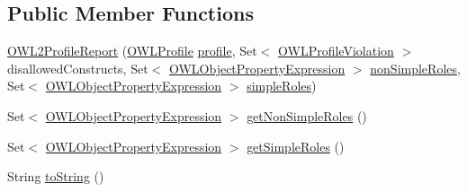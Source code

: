 \subsection*{Public Member Functions}
\begin{DoxyCompactItemize}
\item 
\hyperlink{classorg_1_1semanticweb_1_1owlapi_1_1profiles_1_1_o_w_l2_profile_report_a313a51004558a980b9a338081418b156}{O\-W\-L2\-Profile\-Report} (\hyperlink{interfaceorg_1_1semanticweb_1_1owlapi_1_1profiles_1_1_o_w_l_profile}{O\-W\-L\-Profile} \hyperlink{classorg_1_1semanticweb_1_1owlapi_1_1profiles_1_1_o_w_l_profile_report_afa83cbee66be572072c3ebdcb986b684}{profile}, Set$<$ \hyperlink{classorg_1_1semanticweb_1_1owlapi_1_1profiles_1_1_o_w_l_profile_violation}{O\-W\-L\-Profile\-Violation} $>$ disallowed\-Constructs, Set$<$ \hyperlink{interfaceorg_1_1semanticweb_1_1owlapi_1_1model_1_1_o_w_l_object_property_expression}{O\-W\-L\-Object\-Property\-Expression} $>$ \hyperlink{classorg_1_1semanticweb_1_1owlapi_1_1profiles_1_1_o_w_l2_profile_report_ab2b4842785549a5695bda2356084d55d}{non\-Simple\-Roles}, Set$<$ \hyperlink{interfaceorg_1_1semanticweb_1_1owlapi_1_1model_1_1_o_w_l_object_property_expression}{O\-W\-L\-Object\-Property\-Expression} $>$ \hyperlink{classorg_1_1semanticweb_1_1owlapi_1_1profiles_1_1_o_w_l2_profile_report_a74fba7c1e8d24b9d655a833ba2c64d16}{simple\-Roles})
\item 
Set$<$ \hyperlink{interfaceorg_1_1semanticweb_1_1owlapi_1_1model_1_1_o_w_l_object_property_expression}{O\-W\-L\-Object\-Property\-Expression} $>$ \hyperlink{classorg_1_1semanticweb_1_1owlapi_1_1profiles_1_1_o_w_l2_profile_report_a20de209654c3dbfabe8effbb1c7fa35b}{get\-Non\-Simple\-Roles} ()
\item 
Set$<$ \hyperlink{interfaceorg_1_1semanticweb_1_1owlapi_1_1model_1_1_o_w_l_object_property_expression}{O\-W\-L\-Object\-Property\-Expression} $>$ \hyperlink{classorg_1_1semanticweb_1_1owlapi_1_1profiles_1_1_o_w_l2_profile_report_a18fb2da9cffbfffea484bdc39a719972}{get\-Simple\-Roles} ()
\item 
String \hyperlink{classorg_1_1semanticweb_1_1owlapi_1_1profiles_1_1_o_w_l2_profile_report_adc365ced6940a077a674ed3eccab98e0}{to\-String} ()
\end{DoxyCompactItemize}
